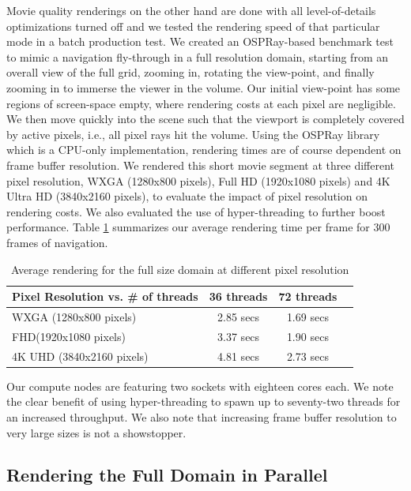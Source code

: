 \documentclass[5p,times]{elsarticle}
\begin{document}
Movie quality renderings on the other hand are done with all level-of-details
optimizations turned off and we tested the rendering speed of that particular
mode in a batch production test.
We created an OSPRay-based benchmark test to mimic a navigation fly-through in
a full resolution domain, starting from an overall view of the full grid, zooming in, rotating
the view-point, and finally zooming in to immerse the viewer in the volume. Our initial view-point has some regions of screen-space empty, where rendering costs at each pixel are negligible. We then move quickly into the scene such that
the viewport is completely covered by active pixels, i.e., all pixel rays hit the volume.
Using the OSPRay library which is a CPU-only implementation, rendering times are of course
dependent on frame buffer resolution. We rendered this short movie segment
at three different pixel resolution, WXGA (1280x800 pixels), Full HD (1920x1080 pixels)
and 4K Ultra HD (3840x2160 pixels), to evaluate the impact of pixel resolution on rendering costs.
We also evaluated the use of hyper-threading to further boost performance.
Table \ref{tab:osprayThreads} summarizes
our average rendering time per frame for 300 frames of navigation.

\begin{table}[htb]
  \centering
  \caption{
    Average rendering for the full size domain at different pixel resolution
  }
  \label{tab:osprayThreads}

  \begin{tabular}{lccc}
    \hline
    Pixel Resolution vs. \# of threads  & 36 threads & 72 threads\\
    \hline
    WXGA (1280x800 pixels) & 2.85 secs &  1.69 secs \\
    FHD(1920x1080 pixels) & 3.37 secs &  1.90 secs \\
    4K UHD (3840x2160 pixels) & 4.81 secs &  2.73 secs \\
    \hline

  \end{tabular}
\end{table}

Our compute nodes are featuring two sockets with eighteen cores each. We note
the clear benefit of using hyper-threading to spawn up to seventy-two threads
for an increased throughput. We also note that increasing frame buffer resolution
to very large sizes is not a showstopper. 

\subsection{Rendering the Full Domain in Parallel}
\end{document}
